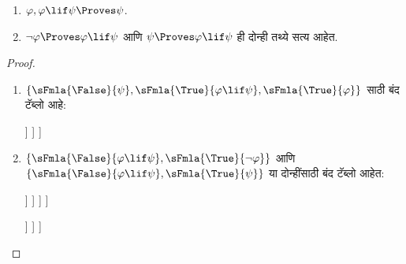 \begin{prop}\label{fol:tab:ppr:prop:provability-lif}
  \begin{enumerate}
  \item \label{fol:tab:ppr:prop:provability-lif-left}  $\varphi, \varphi \lif \psi \Proves \psi$.
  \item \label{fol:tab:ppr:prop:provability-lif-right}
    $\lnot \varphi \Proves \varphi \lif \psi$ आणि $\psi \Proves \varphi \lif \psi$ ही दोन्ही
    तथ्ये सत्य आहेत.
  \end{enumerate}
\end{prop}

\begin{proof}
  \begin{enumerate}
    \item $\{\sFmla{\False}{\psi}, \sFmla{\True}{\varphi \lif \psi},
      \sFmla{\True}{\varphi}\}$ साठी बंद टॅब्लो आहे:
      \begin{oltableau}
        [\sFmla{\False}{\psi}, just=\TAss
          [\sFmla{\True}{\varphi \lif \psi}, just=\TAss
            [\sFmla{\True}{\varphi}, just=\TAss
              [\sFmla{\False}{\varphi}, just = {\TRule{\True}{\lif}[2]}, close]
              [\sFmla{\True}{\psi}, just = {\TRule{\True}{\lif}[2]}, close]
            ]
          ]
        ]
      \end{oltableau}
    \item $\{\sFmla{\False}{\varphi \lif \psi}, \sFmla{\True}{\lnot \varphi}\}$ आणि
      $\{\sFmla{\False}{\varphi \lif \psi}, \sFmla{\True}{\psi}\}$ या दोन्हींसाठी
      बंद टॅब्लो आहेत:
      \begin{oltableau}
        [\sFmla{\False}{\varphi \lif \psi}, just = \TAss
          [\sFmla{\True}{\lnot \varphi}, just = \TAss
            [\sFmla{\True}{\varphi}, just = {\TRule{\False}{\lif}[1]}
              [\sFmla{\False}{\psi}, just = {\TRule{\False}{\lif}[1]}
                [\sFmla{\False}{\varphi}, just = {\TRule{\True}{\lnot}[2]}, close]
              ]
            ]
          ]
        ]
      \end{oltableau}
      \begin{oltableau}
        [\sFmla{\False}{\varphi \lif \psi}, just = \TAss
          [\sFmla{\True}{\psi}, just = \TAss
            [\sFmla{\True}{\varphi}, just = {\TRule{\False}{\lif}[1]}
              [\sFmla{\False}{\psi}, just = {\TRule{\False}{\lif}[1]},close
              ]
            ]
          ]
        ]
      \end{oltableau}
  \end{enumerate}
\end{proof}











